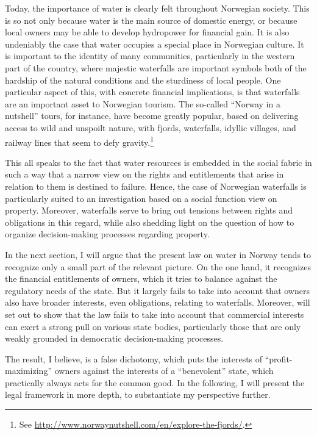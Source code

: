 Today, the importance of water is clearly felt throughout Norwegian society. This is so not only because water is the main source of domestic energy, or because local owners may be able to develop hydropower for financial gain. It is also undeniably the case that water occupies a special place in Norwegian culture. It is important to the identity of many communities, particularly in the western part of the country, where majestic waterfalls are important symbols both of the hardship of the natural conditions and the sturdiness of local people. One particular aspect of this, with concrete financial implications, is that waterfalls are an important asset to Norwegian tourism. The so-called ``Norway in a nutshell'' tours, for instance, have become greatly popular, based on delivering access to wild and unspoilt nature, with fjords, waterfalls, idyllic villages, and railway lines that seem to defy gravity.\footnote{See \url{http://www.norwaynutshell.com/en/explore-the-fjords/}.}

This all speaks to the fact that water resources is embedded in the social fabric in such a way that a narrow view on the rights and entitlements that arise in relation to them is destined to failure. Hence, the case of Norwegian waterfalls is particularly suited to an investigation based on a social function view on property. Moreover, waterfalls serve to bring out tensions between rights and obligations in this regard, while also shedding light on the question of how to organize decision-making processes regarding property.

In the next section, I will argue that the present law on water in Norway tends to recognize only a small part of the relevant picture. On the one hand, it recognizes the financial entitlements of owners, which it tries to balance against the regulatory needs of the state. But it largely fails to take into account that owners also have broader interests, even obligations, relating to waterfalls. Moreover, will set out to show that the law fails to take into account that commercial interests can exert a strong pull on various state bodies, particularly those that are only weakly grounded in democratic decision-making processes. 

The result, I believe, is a false dichotomy, which puts the interests of ``profit-maximizing'' owners against the interests of a ``benevolent'' state, which practically always acts for the common good. In the following, I will present the legal framework in more depth, to substantiate my perspective further.

